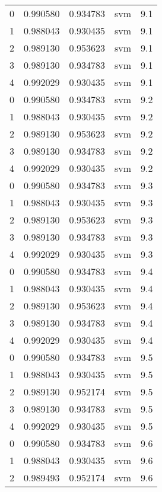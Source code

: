 \begin{tabular}{rrrlr}
     0 & 0.990580 & 0.934783 &      svm &        9.1 \\
     1 & 0.988043 & 0.930435 &      svm &        9.1 \\
     2 & 0.989130 & 0.953623 &      svm &        9.1 \\
     3 & 0.989130 & 0.934783 &      svm &        9.1 \\
     4 & 0.992029 & 0.930435 &      svm &        9.1 \\
     0 & 0.990580 & 0.934783 &      svm &        9.2 \\
     1 & 0.988043 & 0.930435 &      svm &        9.2 \\
     2 & 0.989130 & 0.953623 &      svm &        9.2 \\
     3 & 0.989130 & 0.934783 &      svm &        9.2 \\
     4 & 0.992029 & 0.930435 &      svm &        9.2 \\
     0 & 0.990580 & 0.934783 &      svm &        9.3 \\
     1 & 0.988043 & 0.930435 &      svm &        9.3 \\
     2 & 0.989130 & 0.953623 &      svm &        9.3 \\
     3 & 0.989130 & 0.934783 &      svm &        9.3 \\
     4 & 0.992029 & 0.930435 &      svm &        9.3 \\
     0 & 0.990580 & 0.934783 &      svm &        9.4 \\
     1 & 0.988043 & 0.930435 &      svm &        9.4 \\
     2 & 0.989130 & 0.953623 &      svm &        9.4 \\
     3 & 0.989130 & 0.934783 &      svm &        9.4 \\
     4 & 0.992029 & 0.930435 &      svm &        9.4 \\
     0 & 0.990580 & 0.934783 &      svm &        9.5 \\
     1 & 0.988043 & 0.930435 &      svm &        9.5 \\
     2 & 0.989130 & 0.952174 &      svm &        9.5 \\
     3 & 0.989130 & 0.934783 &      svm &        9.5 \\
     4 & 0.992029 & 0.930435 &      svm &        9.5 \\
     0 & 0.990580 & 0.934783 &      svm &        9.6 \\
     1 & 0.988043 & 0.930435 &      svm &        9.6 \\
     2 & 0.989493 & 0.952174 &      svm &        9.6 \\

\end{tabular}
